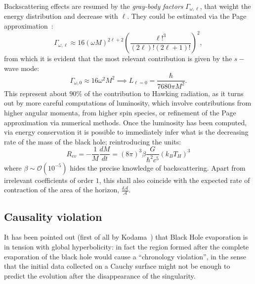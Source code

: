 Backscattering effects are resumed by the \emph{gray-body factors} \(\Gamma_{\omega, \ell}\), that weight the energy distribution and decrease with \(\ell\). They could be estimated via the Page approximation~\cite[]{page1976particle}:
\[
	\Gamma_{\omega,\ell} \approx 16(\omega M)^{2\ell + 2}\left(\frac{\ell!^3}{(2\ell)!(2\ell + 1)!}\right)^2,
\]
from which it is evident that the most relevant contribution is given by the \(s-\)wave mode:
\[
\Gamma_{\omega, 0} \approx 16\omega^2M^2 \implies L_{\ell = 0} = \frac{\hbar}{7680\pi M^2}.
\]
This represent about \(90\%\) of the contribution to Hawking radiation, as it turns out by more careful computations of luminosity, which involve contributions from higher angular momenta, from higher spin species, or refinement of the Page approximation via numerical methods.
Once the luminosity has been computed, via energy conservation it is possible to immediately infer what is the decreasing rate of the mass of the black hole; reintroducing the units:
\begin{equation}
	\label{eq:evaporation-rate}
	R_{ev} = -\frac{1}{M}\frac{dM}{dt} = (8\pi)^3\beta \frac{G}{\hbar^2c^5}\left(k_BT_H\right)^3
\end{equation}
where \(\beta \sim \mathcal{O}(10^{-5})\) hides the precise knowledge of backscattering. Apart from irrelevant coefficients of order \(1\), this shall also coincide with the expected rate of contraction of the area of the horizon, \(\frac{\delta\mathcal{A}}{\mathcal{A}}\).

\subsection{Causality violation}
\label{subsec:causaliy-bh-evaporation}
It has been pointed out (first of all by Kodama~\cite{Kodama:1979vm}) that Black Hole evaporation is in tension with global hyperbolicity: in fact the region formed after the complete evaporation of the black hole would cause a ``chronology violation'', in the sense that the initial data collected on a Cauchy surface might not be enough to predict the evolution after the disappearance of the singularity.

